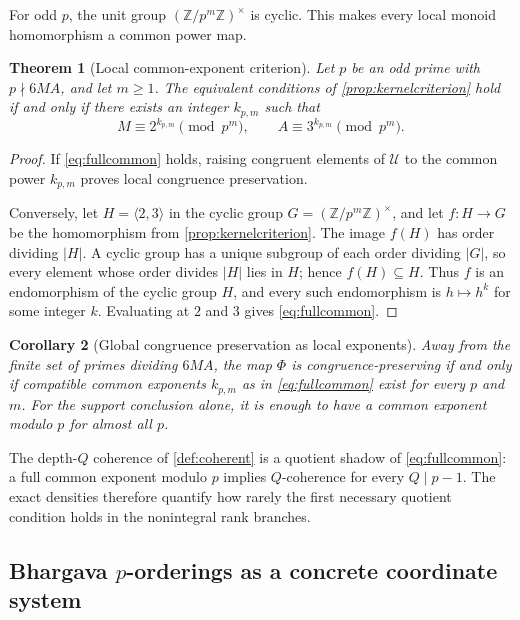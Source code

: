 \documentclass[11pt]{article}
\newtheorem{theorem}{Theorem}[section]
\newtheorem{corollary}[theorem]{Corollary}
\theoremstyle{definition}
\theoremstyle{remark}
\newcommand{\Z}{\mathbb{Z}}
\begin{document}
For odd $p$, the unit group $(\Z/p^m\Z)^\times$ is cyclic.  This makes every local monoid
homomorphism a common power map.

\begin{theorem}[Local common-exponent criterion]\label{thm:localcommon}
Let $p$ be an odd prime with $p\nmid6MA$, and let $m\ge1$.  The equivalent conditions of
\cref{prop:kernelcriterion} hold if and only if there exists an integer $k_{p,m}$ such that
\[
       M\equiv2^{k_{p,m}}\pmod{p^m},
       \qquad
       A\equiv3^{k_{p,m}}\pmod{p^m}.
       \tag{9.2}\label{eq:fullcommon}
\]
\end{theorem}
\begin{proof}
If \eqref{eq:fullcommon} holds, raising congruent elements of $\mathcal U$ to the common power
$k_{p,m}$ proves local congruence preservation.

Conversely, let $H=\langle2,3\rangle$ in the cyclic group
$G=(\Z/p^m\Z)^\times$, and let $f:H\to G$ be the homomorphism from
\cref{prop:kernelcriterion}.  The image $f(H)$ has order dividing $|H|$.  A cyclic group has a
unique subgroup of each order dividing $|G|$, so every element whose order divides $|H|$ lies
in $H$; hence $f(H)\subseteq H$.  Thus $f$ is an endomorphism of the cyclic group $H$, and every
such endomorphism is $h\mapsto h^k$ for some integer $k$.  Evaluating at $2$ and $3$ gives
\eqref{eq:fullcommon}.
\end{proof}

\begin{corollary}[Global congruence preservation as local exponents]\label{cor:globalCP}
Away from the finite set of primes dividing $6MA$, the map $\Phi$ is congruence-preserving if
and only if compatible common exponents $k_{p,m}$ as in \eqref{eq:fullcommon} exist for every
$p$ and $m$.  For the support conclusion alone, it is enough to have a common exponent modulo
$p$ for almost all $p$.
\end{corollary}

The depth-$Q$ coherence of \cref{def:coherent} is a quotient shadow of
\eqref{eq:fullcommon}: a full common exponent modulo $p$ implies $Q$-coherence for every
$Q\mid p-1$.  The exact densities therefore quantify how rarely the first necessary quotient
condition holds in the nonintegral rank branches.

\subsection{Bhargava \texorpdfstring{$p$-orderings}{p-orderings} as a concrete coordinate system}
\end{document}
